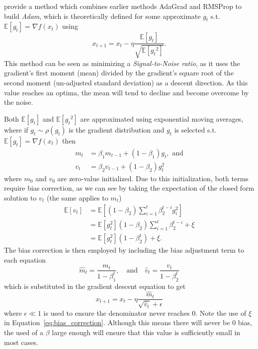 \documentclass{article}
\newcommand{\E}{\mathbb E}
\begin{document}
\citeauthor{DBLP:journals/corr/KingmaB14} provide a method which combines
earlier methods AdaGrad and RMSProp to build \emph{Adam}, which is theoretically
defined for some approximate $g_t$ s.t. $\E [g_t] = \nabla f(x_t)$ using
\begin{equation}
    x_{t + 1} = x_t - \eta \frac{\E \left[ g_t \right]}{\sqrt{\E \left[
        {g_t}^2  \right] }}.
\end{equation}
This method can be seen as minimizing a \emph{Signal-to-Noise ratio}, as it
uses the gradient's first moment (mean) divided by the gradient's square root of
the second moment (un-adjusted standard deviation) as a descent direction. As
this value reaches an optima, the mean will tend to decline and become overcome
by the noise.

Both $\E \left[ g_t \right]$ and $\E \left[ {g_t}^2
\right]$ are approximated using exponential moving averages, where if $g_t \sim
\rho(g_t)$ is the gradient distribution and $g_t$ is selected s.t. $\E[g_t] =
\nabla f(x_t)$ then
\begin{equation}
    \begin{aligned}
        m_t &= \beta_1 m_{t-1} + (1 - \beta_1)g_{t}, \text{ and} \\
        v_t &= \beta_2 v_{t-1} + (1 - \beta_2)g_{t}^2
    \end{aligned}
\end{equation}
where $m_0$ and $v_0$ are zero-value initialized. Due to this initialization,
both terms require bias correction, as we can see by taking the expectation of
the closed form solution to $v_t$ (the same applies to $m_t$)
\begin{equation}
    \label{eq:bias_correction}
    \begin{aligned}
        \E \left[ v_t \right] &= \E \left[ (1 - \beta_2) \sum_{i = 1}^t
        \beta_2^{t - i} g_i^2 \right] \\
         &= \E \left[g_t^2 \right](1 - \beta_2) \sum_{i = 1}^t
        \beta_2^{t - i} + \xi \\
         &= \E \left[g_t^2 \right](1 - \beta_2^t) + \xi.
    \end{aligned}
\end{equation}
The bias correction is then employed by including the bias adjustment term to
each equation
\begin{equation}
    \hat m_t = \frac{m_t}{1 - \beta_1^t}, \quad \text{and} \quad
    \hat v_t = \frac{v_t}{1 - \beta_2^t}
\end{equation}
which is substituted in the gradient descent equation to get 
\begin{equation}
    x_{t + 1} = x_t - \eta \frac{\hat m_t}{\sqrt{\hat v_t} + \epsilon}
\end{equation}
where $\epsilon \ll 1$ is used to ensure the denominator never reaches 0. Note
the use of $\xi$ in Equation~\ref{eq:bias_correction}. Although this means there
will never be 0 bias, the used of a $\beta$ large enough will ensure that this
value is sufficiently small in most cases.



\end{document}
